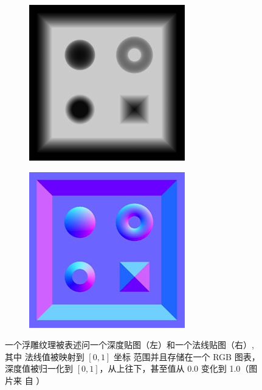 \begin{figure}
\sidecaption
{
	\begin{subfigure}[t]{0.31\textwidth}
		\includegraphics[width=\textwidth]{graphics/df/relief-mapping-representation1}
	\end{subfigure}
	\begin{subfigure}[t]{0.31\textwidth}
		\includegraphics[width=\textwidth]{graphics/df/relief-mapping-representation2}
	\end{subfigure}
}
	\caption{一个浮雕纹理被表述问一个深度贴图（左）和一个法线贴图（右）, 其中 法线值被映射到 $[0,1]$ 坐标 范围并且存储在一个 RGB 图表，深度值被归一化到 $[0,1]$，从上往下，甚至值从 0.0 变化到 1.0（图片来 自 \cite{a:Real-TimeReliefMappingonArbitraryPolygonalSurfaces}）}
	\label{f:df-relief-mapping-representation}
\end{figure}

